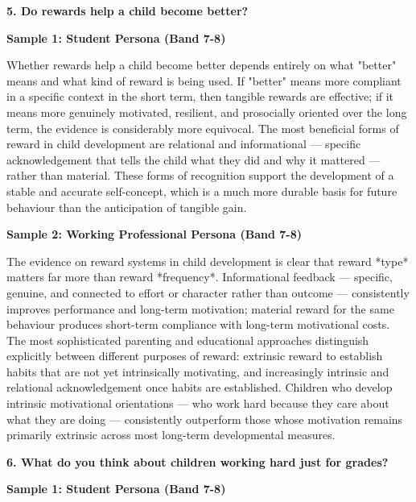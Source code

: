 \separator

\begin{ieltsquestion}
\textbf{5. Do rewards help a child become better?}
\end{ieltsquestion}
\textbf{Sample 1: Student Persona (Band 7-8)}

Whether rewards help a child become better depends entirely on what "better" means and what kind of reward is being used. If "better" means more compliant in a specific context in the short term, then tangible rewards are effective; if it means more genuinely motivated, resilient, and prosocially oriented over the long term, the evidence is considerably more equivocal. The most beneficial forms of reward in child development are relational and informational — specific acknowledgement that tells the child what they did and why it mattered — rather than material. These forms of recognition support the development of a stable and accurate self-concept, which is a much more durable basis for future behaviour than the anticipation of tangible gain.

\textbf{Sample 2: Working Professional Persona (Band 7-8)}

The evidence on reward systems in child development is clear that reward *type* matters far more than reward *frequency*. Informational feedback — specific, genuine, and connected to effort or character rather than outcome — consistently improves performance and long-term motivation; material reward for the same behaviour produces short-term compliance with long-term motivational costs. The most sophisticated parenting and educational approaches distinguish explicitly between different purposes of reward: extrinsic reward to establish habits that are not yet intrinsically motivating, and increasingly intrinsic and relational acknowledgement once habits are established. Children who develop intrinsic motivational orientations — who work hard because they care about what they are doing — consistently outperform those whose motivation remains primarily extrinsic across most long-term developmental measures.

\separator

\begin{ieltsquestion}
\textbf{6. What do you think about children working hard just for grades?}
\end{ieltsquestion}
\textbf{Sample 1: Student Persona (Band 7-8)}

